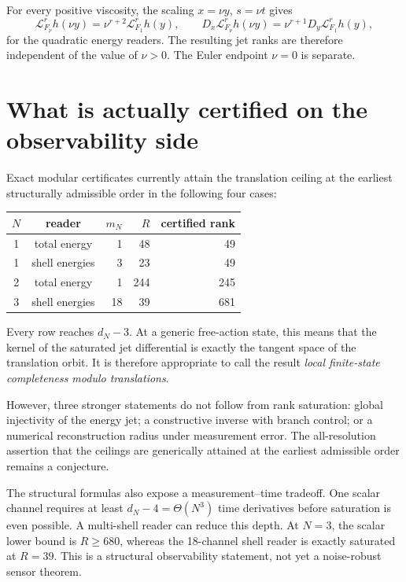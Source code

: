 \documentclass[11pt]{article}
\theoremstyle{definition}
\begin{document}
For every positive viscosity, the scaling $x=\nu y$, $s=\nu t$ gives
\[
\mathcal L_{F_\nu}^r h(\nu y)=\nu^{r+2}\mathcal L_{F_1}^r h(y),
\qquad
D_x\mathcal L_{F_\nu}^r h(\nu y)=\nu^{r+1}D_y\mathcal L_{F_1}^r h(y),
\]
for the quadratic energy readers.  The resulting jet ranks are therefore independent of the value
of $\nu>0$.  The Euler endpoint $\nu=0$ is separate.

\section{What is actually certified on the observability side}

Exact modular certificates currently attain the translation ceiling at the earliest structurally
admissible order in the following four cases:
\begin{center}
\begin{tabular}{ccrrr}
\toprule
$N$ & reader & $m_N$ & $R$ & certified rank \\
\midrule
1 & total energy & 1 & 48 & 49 \\
1 & shell energies & 3 & 23 & 49 \\
2 & total energy & 1 & 244 & 245 \\
3 & shell energies & 18 & 39 & 681 \\
\bottomrule
\end{tabular}
\end{center}
Every row reaches $d_N-3$.  At a generic free-action state, this means that the kernel of the
saturated jet differential is exactly the tangent space of the translation orbit.  It is therefore
appropriate to call the result \emph{local finite-state completeness modulo translations}.

However, three stronger statements do not follow from rank saturation: global injectivity of the
energy jet; a constructive inverse with branch control; or a numerical reconstruction radius under
measurement error.  The all-resolution assertion that the ceilings are generically attained at the
earliest admissible order remains a conjecture.

The structural formulas also expose a measurement--time tradeoff.  One scalar channel requires at
least $d_N-4=\Theta(N^3)$ time derivatives before saturation is even possible.  A multi-shell reader
can reduce this depth.  At $N=3$, the scalar lower bound is $R\ge680$, whereas the 18-channel shell
reader is exactly saturated at $R=39$.  This is a structural observability statement, not yet a
noise-robust sensor theorem.
\end{document}

